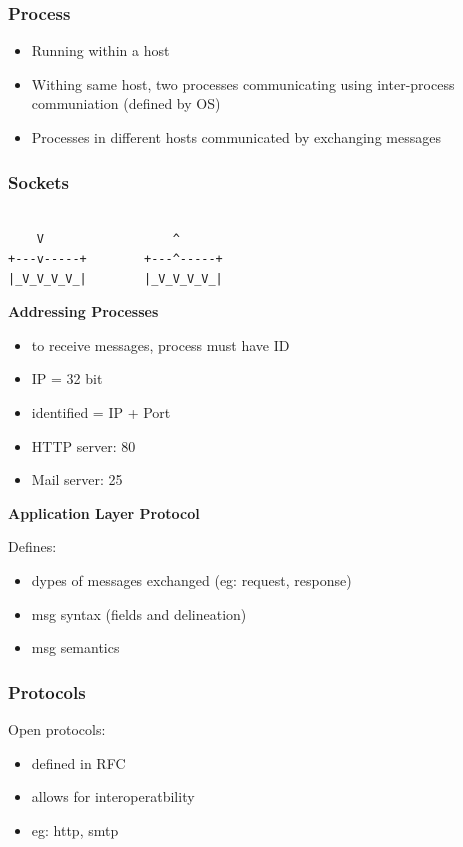 \documentclass[11pt]{article}
\begin{document}
\subsubsection{Process}
\label{sec:orge22d0fe}
\begin{itemize}
\item Running within a host
\item Withing same host, two processes communicating using inter-process
communiation (defined by OS)
\item Processes in different hosts communicated by exchanging messages
\end{itemize}

\subsubsection{Sockets}
\label{sec:orgeb4954e}

\begin{verbatim}

    V                  ^
+---v-----+        +---^-----+  
|_V_V_V_V_|        |_V_V_V_V_|

\end{verbatim}

\textbf{Addressing Processes}
\begin{itemize}
\item to receive messages, process must have ID
\item IP = 32 bit
\item identified = IP + Port
\item HTTP server: 80
\item Mail server: 25
\end{itemize}

\textbf{Application Layer Protocol}

Defines:
\begin{itemize}
\item dypes of messages exchanged (eg: request, response)
\item msg syntax (fields and delineation)
\item msg semantics
\end{itemize}

\subsubsection{Protocols}
\label{sec:org0cc288e}

Open protocols:
\begin{itemize}
\item defined in RFC
\item allows for interoperatbility
\item eg: http, smtp
\end{itemize}
\end{document}
